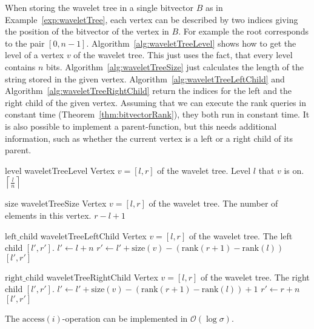 When storing the wavelet tree in a single bitvector $B$ as in Example~\ref{exp:waveletTree}, each vertex can be described by two indices giving the position of the bitvector of the vertex in $B$. For example the root corresponds to the pair $[0,n-1]$. Algorithm~\ref{alg:waveletTreeLevel} shows how to get the level of a vertex $v$ of the wavelet tree. This just uses the fact, that every level contains $n$ bits. Algorithm~\ref{alg:waveletTreeSize} just calculates the length of the string stored in the given vertex. Algorithm~\ref{alg:waveletTreeLeftChild} and Algorithm~\ref{alg:waveletTreeRightChild} return the indices for the left and the right child of the given vertex. Assuming that we can execute the rank queries in constant time (Theorem~\ref{thm:bitvectorRank}), they both run in constant time. It is also possible to implement a $\mathrm{parent}$-function, but this needs additional information, such as whether the current vertex is a left or a right child of its parent.

\begin{pseudocode}
  {$\mathrm{level}$}
  {waveletTreeLevel}
  {Vertex $v=[l,r]$ of the wavelet tree.}
  {Level $l$ that $v$ is on.}
  \RETURN $\left\lceil \frac{l}{n} \right\rceil$
\end{pseudocode}

\begin{pseudocode}
  {$\mathrm{size}$}
  {waveletTreeSize}
  {Vertex $v=[l,r]$ of the wavelet tree.}
  {The number of elements in this vertex.}
  \RETURN $r - l + 1$
\end{pseudocode}

\begin{pseudocode}
  {$\mathrm{left\_child}$}
  {waveletTreeLeftChild}
  {Vertex $v=[l,r]$ of the wavelet tree.}
  {The left child $[l',r']$.}
  \STATE $l' \gets l + n$
  \STATE $r' \gets l' + \mathrm{size}(v) - (\mathrm{rank}(r + 1) - \mathrm{rank}(l))$
  \RETURN $[l',r']$
\end{pseudocode}

\begin{pseudocode}
  {$\mathrm{right\_child}$}
  {waveletTreeRightChild}
  {Vertex $v=[l,r]$ of the wavelet tree.}
  {The right child $[l',r']$.}
  \STATE $l' \gets l' + \mathrm{size}(v) - (\mathrm{rank}(r + 1) - \mathrm{rank}(l)) + 1$
  \STATE $r' \gets r + n$
  \RETURN $[l',r']$
\end{pseudocode}

\begin{Theorem}
  \label{thm:waveletTreeAceess}
  The $\mathrm{access}(i)$-operation can be implemented in $\mathcal{O}(\log \sigma)$.
\end{Theorem}


